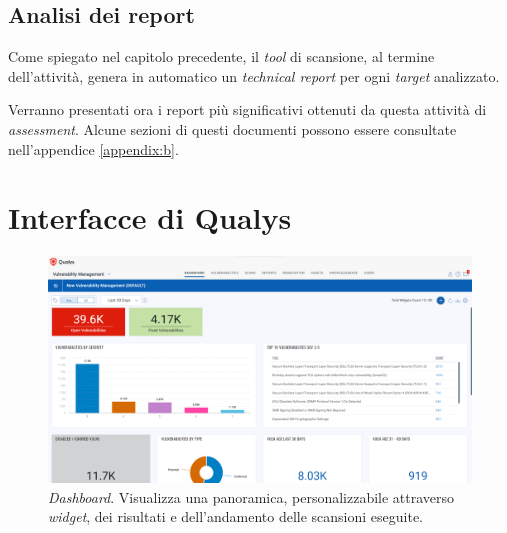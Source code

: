 \documentclass[target=bach,aauheader=]{thud}
\begin{document}
\pagebreak

\section{Analisi dei report}
Come spiegato nel capitolo precedente, il \textit{tool} di scansione, al termine dell'attività, genera in automatico un \textit{technical report} per ogni \textit{target} analizzato.

Verranno presentati ora i report più significativi ottenuti da questa attività di \textit{assessment}.\newline
Alcune sezioni di questi documenti possono essere consultate nell'appendice \ref{appendix:b}.



\appendix


\chapter{Interfacce di Qualys}
\label{appendix:a}

\begin{figure}[h]
\centering
    \includegraphics[scale=0.329]{images/qualys_dashboard.png}
    \caption{\textit{Dashboard}. Visualizza una panoramica, personalizzabile attraverso \textit{widget}, dei risultati e dell'andamento delle scansioni eseguite.}
\end{figure}
\end{document}
